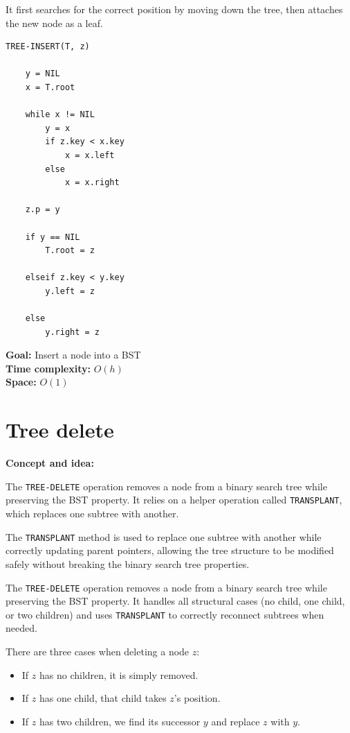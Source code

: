 \documentclass[11pt,a4paper,openany]{book}
\begin{document}
It first searches for the correct position by moving down the tree, then attaches the new node as a leaf.

\begin{lstlisting}
TREE-INSERT(T, z)

    y = NIL
    x = T.root

    while x != NIL
        y = x
        if z.key < x.key
            x = x.left
        else
            x = x.right

    z.p = y

    if y == NIL
        T.root = z

    elseif z.key < y.key
        y.left = z

    else
        y.right = z
\end{lstlisting}

\textbf{Goal:} Insert a node into a BST \\

\textbf{Time complexity:} $O(h)$ \\

\textbf{Space:} $O(1)$










\vspace{2cm}

\section{Tree delete}

\textbf{Concept and idea:}

The \texttt{TREE-DELETE} operation removes a node from a binary search tree while preserving the BST property.  
It relies on a helper operation called \texttt{TRANSPLANT}, which replaces one subtree with another.

The \texttt{TRANSPLANT} method is used to replace one subtree with another while correctly updating parent pointers, allowing the tree structure to be modified safely without breaking the binary search tree properties.  

The \texttt{TREE-DELETE} operation removes a node from a binary search tree while preserving the BST property. It handles all structural cases (no child, one child, or two children) and uses \texttt{TRANSPLANT} to correctly reconnect subtrees when needed.

There are three cases when deleting a node $z$:
\begin{itemize}
    \item If $z$ has no children, it is simply removed.
    \item If $z$ has one child, that child takes $z$'s position.
    \item If $z$ has two children, we find its successor $y$ and replace $z$ with $y$.
\end{itemize}
\end{document}
